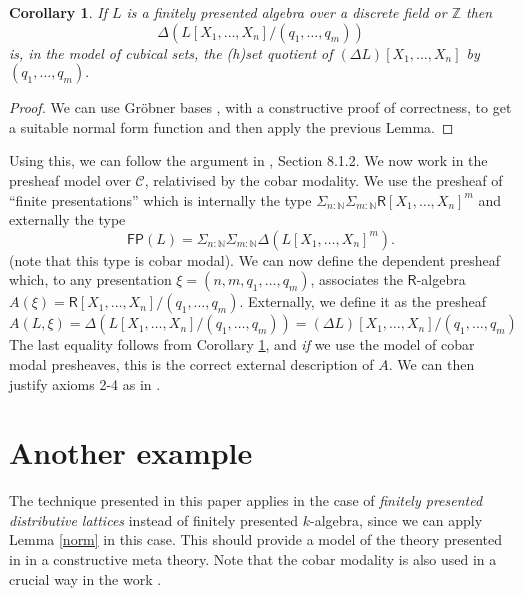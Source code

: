 \documentclass[10pt,a4paper]{article}
\newtheorem{corollary}[theorem]{Corollary}
\theoremstyle{definition}
\theoremstyle{remark}
\newcommand{\nats}{\mathbb{N}}
\newcommand{\ints}{\mathbb{Z}}
\newcommand{\CC}{\mathcal{C}}
\newcommand\RR{\mathsf{R}}
\begin{document}

\begin{corollary}\label{quot}
  If $L$ is a finitely presented algebra over a discrete field or $\ints$ then
  \[
  \Delta (L[X_1,\dots,X_n]/(q_1,\dots,q_m))
  \]
  is, in the model of cubical sets, the (h)set quotient
  of $(\Delta L)[X_1,\dots,X_n]$ by $(q_1,\dots,q_m).$
\end{corollary}

\begin{proof}
  We can use Gr\"obner bases \cite{yengui2006}, with a constructive proof of correctness, to get a suitable normal form function
  and then apply the previous Lemma.
\end{proof}

\newcommand{\FP}{\mathsf{FP}}
\newcommand{\UU}{\mathcal{U}}

Using this, we can follow the argument in \cite{draft}, Section 8.1.2. We now work in the presheaf
model over $\CC$, relativised by the cobar modality.
We use the presheaf of ``finite presentations'' which is internally the type
\(\Sigma_{n:\mathbb{N}}\Sigma_{m:\mathbb{N}}\RR[X_{1},\ldots,X_{n}]^{m}\) and externally the type
\[
\FP(L) = \Sigma_{n:\nats}\Sigma_{m:\nats}\Delta (L[X_1,\dots,X_n]^m).
\]
(note that this type is cobar modal).
We can now define the 
dependent presheaf which, to any presentation
$\xi = (n,m,q_1,\dots,q_m)$, associates the $\RR$-algebra $A(\xi) = \RR[X_1,\dots,X_n]/(q_1,\dots,q_m)$.
Externally, we define it as the presheaf
\[
A(L,\xi) = \Delta (L[X_1,\dots,X_n]/(q_1,\dots,q_m)) = (\Delta L)[X_1,\dots,X_n]/(q_1,\dots,q_m)
\]
The last equality follows from Corollary \ref{quot}, and {\em if} we use the model of cobar modal presheaves, this is the correct
external description of $A$. We can then justify axioms 2-4 as in \cite{draft}.

\section{Another example}

The technique presented in this paper applies in the case of {\em finitely presented distributive lattices} instead of
finitely presented $k$-algebra, since we can apply Lemma \ref{norm} in this case. This should provide a model
of the theory presented in \cite{gratzer2024} in a constructive meta theory. Note that the cobar modality is also used
in a crucial way in the work \cite{weaver20}.



\end{document}
